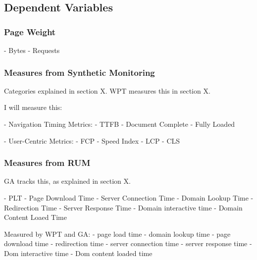 




\subsection{Dependent Variables}


\subsubsection{Page Weight}

	- Bytes
	- Requests

\subsubsection{Measures from Synthetic Monitoring}

Categories explained in section X.
WPT measures this in section X.

I will measure this:

- Navigation Timing Metrics:
	- TTFB
	- Document Complete
	- Fully Loaded
	
- User-Centric Metrics:
	- FCP
	- Speed Index
	- LCP
	- CLS

\subsubsection{Measures from RUM}

GA tracks this, as explained in section X.

- PLT
- Page Download Time
- Server Connection Time
- Domain Lookup Time
- Redirection Time
- Server Response Time
- Domain interactive time
- Domain Content Loaed Time



Measured by WPT and GA:
- page load time
- domain lookup time
- page download time
- redirection time
- server connection time
- server response time
- Dom interactive time
- Dom content loaded time





